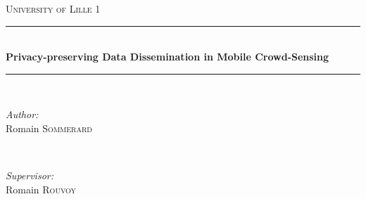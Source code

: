 	
	\begin{titlepage}
		
		\newcommand{\HRule}{\rule{\linewidth}{0.5mm}} %
		
		\center %
		
		
		\textsc{\LARGE University of Lille 1}\\[1.5cm] %
		
		
		\HRule \\[0.4cm]
		\huge \bfseries Privacy-preserving Data Dissemination in Mobile Crowd-Sensing\\[0.4cm] %
		\HRule \\[1.5cm]
		
		
		\begin{minipage}{0.4\textwidth}
			\begin{flushleft} \large
				\emph{Author:}\\
				Romain \textsc{Sommerard} %
			\end{flushleft}
		\end{minipage}
		~
		\begin{minipage}{0.4\textwidth}
			\begin{flushright} \large
				\emph{Supervisor:} \\
				Romain \textsc{Rouvoy} %
			\end{flushright}
		\end{minipage}\\[2cm]
		

\end{titlepage}
